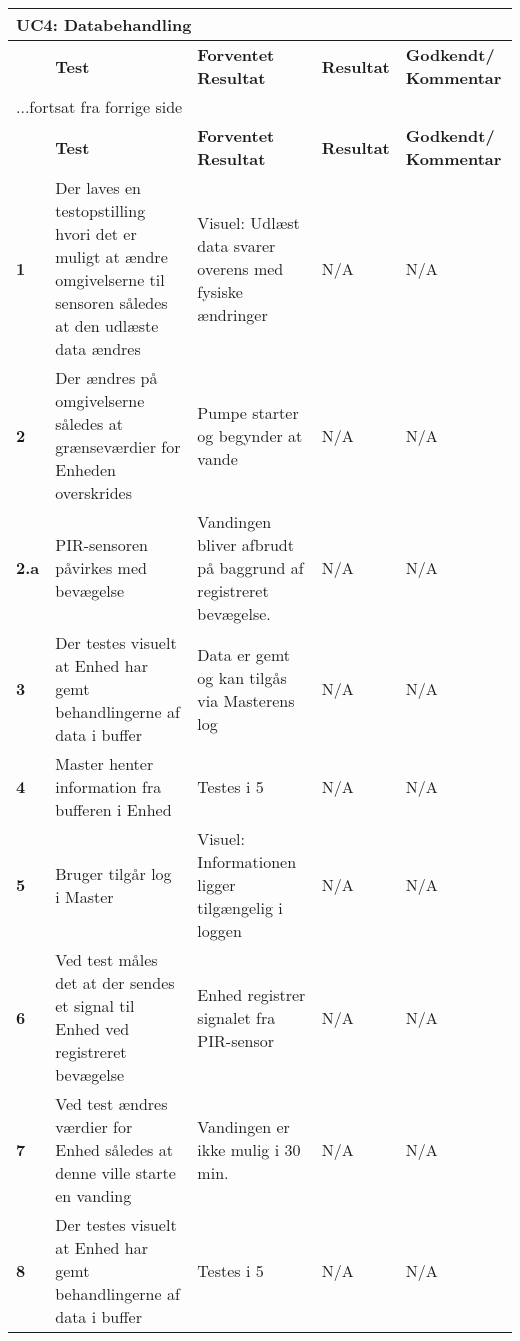 
\begin{center}
\begin{longtable}{|p{}|p{}|p{}|p{}|p{}|} %
\hline
\multicolumn{5}{|l|}{\textbf{UC4: Databehandling}} \\ \hline
\multicolumn{1}{|c|}{} &
\textbf{Test} &
\textbf{Forventet \newline Resultat} &
\textbf{Resultat} &
\textbf{Godkendt/ \newline Kommentar} \\ \hline 
\endfirsthead

\multicolumn{5}{l}{...fortsat fra forrige side} \\ \hline 
\multicolumn{1}{|c|}{} &
\textbf{Test} &
\textbf{Forventet \newline Resultat} &
\textbf{Resultat} &
\textbf{Godkendt/ \newline Kommentar} \\ \hline 
\endhead

\textbf{1}	&Der laves en testopstilling hvori det er muligt at ændre omgivelserne til sensoren således at den udlæste data ændres
			&Visuel: Udlæst data svarer overens med fysiske ændringer
			&N/A
			&N/A \\ \hline 
			
\textbf{2}	&Der ændres på omgivelserne således at grænseværdier for Enheden overskrides
			&Pumpe starter og begynder at vande
			&N/A
			&N/A \\ \hline 
			
\textbf{2.a}	&PIR-sensoren påvirkes med bevægelse
			&Vandingen bliver afbrudt på baggrund af registreret bevægelse.
			&N/A
			&N/A \\ \hline 
			
\textbf{3}	&Der testes visuelt at Enhed har gemt behandlingerne af data i buffer
			&Data er gemt og kan tilgås via Masterens log
			&N/A
			&N/A \\ \hline 

\textbf{4}	&Master henter information fra bufferen i Enhed
			&Testes i 5
			&N/A
			&N/A \\ \hline 
			
\textbf{5}	&Bruger tilgår log i Master 
			&Visuel: Informationen ligger tilgængelig i loggen
			&N/A
			&N/A \\ \hline 
			
\textbf{6}	&Ved test måles det at der sendes et signal til Enhed ved registreret bevægelse
			&Enhed registrer signalet fra PIR-sensor 
			&N/A
			&N/A \\ \hline 
			
\textbf{7}	&Ved test ændres værdier for Enhed således at denne ville starte en vanding
			&Vandingen er ikke mulig i 30 min.
			&N/A
			&N/A \\ \hline 
			
\textbf{8}	&Der testes visuelt at Enhed har gemt behandlingerne af data i buffer
			&Testes i 5
			&N/A
			&N/A \\ \hline 					
			
\end{longtable}
	\label{ATUC4} 
\end{center}
